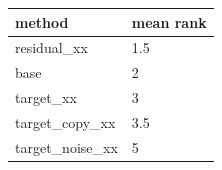 \begin{tabular}{ll}
\toprule
method & mean rank \\
\midrule
residual\_xx & 1.5 \\
base & 2 \\
target\_xx & 3 \\
target\_copy\_xx & 3.5 \\
target\_noise\_xx & 5 \\
\bottomrule
\end{tabular}
